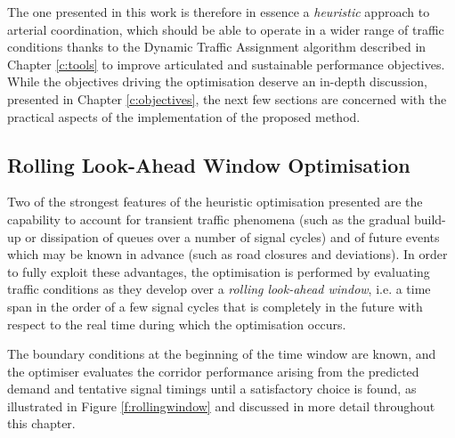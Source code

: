 The one presented in this work is therefore in essence a \emph{heuristic} approach to arterial coordination, which should be able to operate in a wider range of traffic conditions thanks to the Dynamic Traffic Assignment algorithm described in Chapter \ref{c:tools} to improve articulated and sustainable performance objectives. While the objectives driving the optimisation deserve an in-depth discussion, presented in Chapter \ref{c:objectives}, the next few sections are concerned with the practical aspects of the implementation of the proposed method.



\subsection{Rolling Look-Ahead Window Optimisation}
Two of the strongest features of the heuristic optimisation presented are the capability to account for transient traffic phenomena (such as the gradual build-up or dissipation of queues over a number of signal cycles) and of future events which may be known in advance (such as road closures and deviations). In order to fully exploit these advantages, the optimisation is performed by evaluating traffic conditions as they develop over a \emph{rolling look-ahead window}, i.e. a time span in the order of a few signal cycles that is completely in the future with respect to the real time during which the optimisation occurs.

The boundary conditions at the beginning of the time window are known, and the optimiser evaluates the corridor performance arising from the predicted demand and tentative signal timings until a satisfactory choice is found, as illustrated in Figure \ref{f:rollingwindow} and discussed in more detail throughout this chapter.


